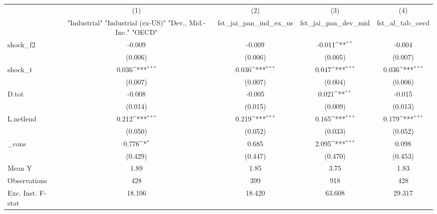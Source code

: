 {
\def\sym#1{\ifmmode^{#1}\else\(^{#1}\)\fi}
\begin{tabular}{l*{4}{c}}
\toprule
            &\multicolumn{1}{c}{(1)}&\multicolumn{1}{c}{(2)}&\multicolumn{1}{c}{(3)}&\multicolumn{1}{c}{(4)}\\
            &\multicolumn{1}{c}{ "Industrial" "Industrial (ex-US)" "Dev., Mid.-Inc." "OECD" }&\multicolumn{1}{c}{fst\_jai\_pan\_ind\_ex\_us}&\multicolumn{1}{c}{fst\_jai\_pan\_dev\_mid}&\multicolumn{1}{c}{fst\_al\_tab\_oecd}\\
\midrule
shock\_f2    &      -0.009         &      -0.009         &      -0.011\sym{**} &      -0.004         \\
            &     (0.006)         &     (0.006)         &     (0.005)         &     (0.007)         \\
\addlinespace
shock\_t     &       0.036\sym{***}&       0.036\sym{***}&       0.047\sym{***}&       0.036\sym{***}\\
            &     (0.007)         &     (0.007)         &     (0.004)         &     (0.006)         \\
\addlinespace
D.tot       &      -0.008         &      -0.005         &       0.021\sym{**} &      -0.015         \\
            &     (0.014)         &     (0.015)         &     (0.009)         &     (0.013)         \\
\addlinespace
L.netlend   &       0.212\sym{***}&       0.219\sym{***}&       0.165\sym{***}&       0.179\sym{***}\\
            &     (0.050)         &     (0.052)         &     (0.033)         &     (0.052)         \\
\addlinespace
\_cons      &       0.776\sym{*}  &       0.685         &       2.095\sym{***}&       0.098         \\
            &     (0.429)         &     (0.447)         &     (0.470)         &     (0.453)         \\
\midrule
Mean Y      &        1.89         &        1.85         &        3.75         &        1.83         \\
Observations&         428         &         399         &         918         &         428         \\
Exc. Inst. F-stat&      18.106         &      18.420         &      63.608         &      29.317         \\
\bottomrule
\end{tabular}
}
